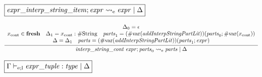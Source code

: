 $\fbox{$\mathit{expr\_interp\_string\_item}; \mathit{expr} \rightsquigarrow_\mathrm{e} \mathit{expr} \mid \Delta$}$

\begin{gather*}
    \infer{\mathit{interp\_string\_cont}\; \mathit{expr}; \mathit{parts}_0 \rightsquigarrow_\mathrm{e} \mathit{parts} \mid \Delta}{
        \begin{array}{c}
            \Delta_0 = \epsilon
            \\
            x_\mathrm{cont} \in \mathbf{fresh}
            \hspace{1em}
            \Delta_1 = x_\mathrm{cont}: \mathrm{\#String}
            \hspace{1em}
            \mathit{parts}_1 = (\mathrm{\#var}(\mathit{addInterpStringPartLit}))(\mathit{parts}_0; \mathrm{\#var}(x_\mathrm{cont}))
            \\
            \Delta = \Delta_1
            \hspace{1em}
            \mathit{parts} = (\mathrm{\#var}(\mathit{addInterpStringPartLit}))(\mathit{parts}_1; \mathit{expr})
        \end{array}
    }
\end{gather*}

$\fbox{$\Gamma \vdash_{\mathrm{e}; \mathrm{l}} \mathit{expr\_tuple}: \mathit{type} \mid \Delta$}$

